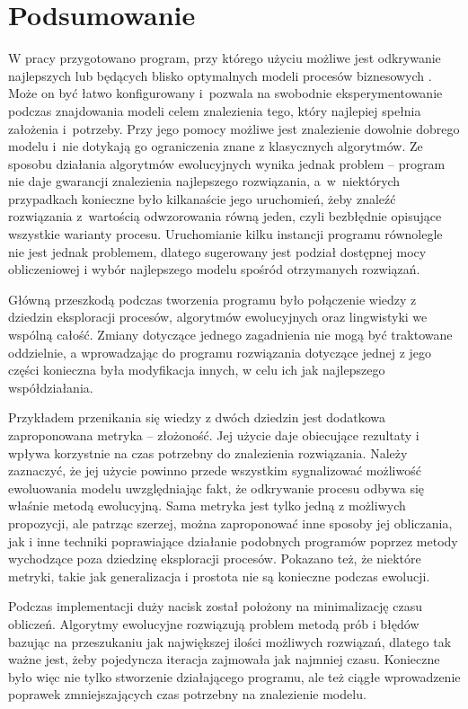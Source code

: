 \chapter{Podsumowanie}

W pracy przygotowano program, przy którego użyciu możliwe jest odkrywanie najlepszych lub będących blisko optymalnych modeli procesów biznesowych \cite{link}. Może on być łatwo konfigurowany i~pozwala na swobodnie eksperymentowanie podczas znajdowania modeli celem znalezienia tego, który najlepiej spełnia założenia i~potrzeby. Przy jego pomocy możliwe jest znalezienie dowolnie dobrego modelu i~nie dotykają go ograniczenia znane z klasycznych algorytmów. Ze sposobu działania algorytmów ewolucyjnych wynika jednak problem -- program nie daje gwarancji znalezienia najlepszego rozwiązania, a~w~niektórych przypadkach konieczne było kilkanaście jego uruchomień, żeby znaleźć rozwiązania z~wartością odwzorowania równą jeden, czyli bezbłędnie opisujące wszystkie warianty procesu. Uruchomianie kilku instancji programu równolegle nie jest jednak problemem, dlatego sugerowany jest podział dostępnej mocy obliczeniowej i wybór najlepszego modelu spośród otrzymanych rozwiązań. 

Główną przeszkodą podczas tworzenia programu było połączenie wiedzy z dziedzin eksploracji procesów, algorytmów ewolucyjnych oraz lingwistyki we wspólną całość. Zmiany dotyczące jednego zagadnienia nie mogą być traktowane oddzielnie, a wprowadzając do programu rozwiązania dotyczące jednej z jego części konieczna była modyfikacja innych, w celu ich jak najlepszego współdziałania.

Przykładem przenikania się wiedzy z dwóch dziedzin jest dodatkowa zaproponowana metryka -- złożoność. Jej użycie daje obiecujące rezultaty i wpływa korzystnie na czas potrzebny do znalezienia rozwiązania. Należy zaznaczyć, że jej użycie powinno przede wszystkim sygnalizować możliwość ewoluowania modelu uwzględniając fakt, że odkrywanie procesu odbywa się właśnie metodą ewolucyjną. Sama metryka jest tylko jedną z możliwych propozycji, ale patrząc szerzej, można zaproponować inne sposoby jej obliczania, jak i inne techniki poprawiające działanie podobnych programów poprzez metody wychodzące poza dziedzinę eksploracji procesów. Pokazano też, że niektóre metryki, takie jak generalizacja i prostota nie są konieczne podczas ewolucji.

Podczas implementacji duży nacisk został położony na minimalizację czasu obliczeń. Algorytmy ewolucyjne rozwiązują problem metodą prób i błędów bazując na przeszukaniu jak największej ilości możliwych rozwiązań, dlatego tak ważne jest, żeby pojedyncza iteracja zajmowała jak najmniej czasu. Konieczne było więc nie tylko stworzenie działającego programu, ale też ciągłe wprowadzenie poprawek zmniejszających czas potrzebny na znalezienie modelu.

